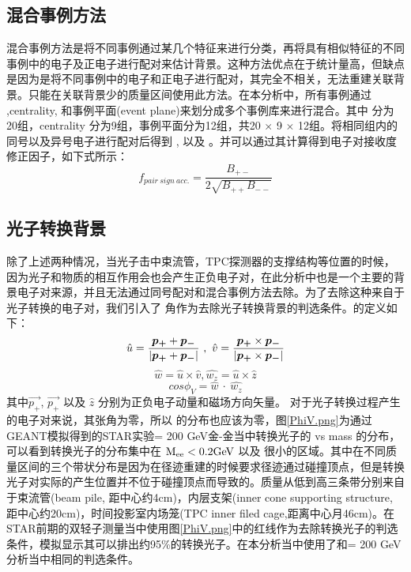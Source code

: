 \subsection{混合事例方法}
混合事例方法是将不同事例通过某几个特征来进行分类，再将具有相似特征的不同事例中的电子及正电子进行配对来估计背景。这种方法优点在于统计量高，但缺点是因为是将不同事例中的电子和正电子进行配对，其完全不相关，无法重建关联背景。只能在关联背景少的质量区间使用此方法。在本分析中，所有事例通过 \Vz ,centrality, 和事例平面(event plane)来划分成多个事例库来进行混合。其中 \Vz 分为20组，centrality 分为9组，事例平面分为12组，共20 $\times$ 9 $\times$ 12组。将相同组内的同号以及异号电子进行配对后得到 \Bpp , \Bmm 以及 \Bpm 。并可以通过其计算得到电子对接收度修正因子，如下式所示：
\begin{equation}
  f_{pair~sign~acc.} = \frac{B_{+-}}{2\sqrt{B_{++}B_{--}}}
\end{equation}


\subsection{光子转换背景}
除了上述两种情况，当光子击中束流管，TPC探测器的支撑结构等位置的时候，因为光子和物质的相互作用会也会产生正负电子对，在此分析中也是一个主要的背景电子对来源，并且无法通过同号配对和混合事例方法去除。为了去除这种来自于光子转换的电子对，我们引入了 \PhiV 角作为去除光子转换背景的判选条件。\PhiV 的定义如下：
\begin{equation}
  \hat{u} = \frac{ \vec{p_{+}} + \vec{p_{-}} }{ |\vec{p_{+}} + \vec{p_{-}}| } ~,~ \hat{v} = \frac{ \vec{p_{+}} \times \vec{p_{-}} }{ |\vec{p_{+}} \times \vec{p_{-}}| } \\
\end{equation}
\begin{equation}
  \hat{w} = \hat{u} \times \hat{v}, \hat{w_z} = \hat{u} \times \hat{z}
\end{equation}
\begin{equation}
  cos\phi_V = \hat{w}~\cdot~\hat{w_z}
\end{equation}
其中$\vec{p_{+}}$, $\vec{p_{+}}$ 以及 $\hat{z}$ 分别为正负电子动量和磁场方向矢量。
对于光子转换过程产生的电子对来说，其张角为零，所以 \PhiV 的分布也应该为零，图\ref{PhiV.png}为通过GEANT模拟得到的STAR实验\sNN = 200 GeV金-金当中转换光子的 \PhiV vs mass 的分布，可以看到转换光子的分布集中在 ${\rm M_{ee} < 0.2 GeV}$ 以及 \PhiV 很小的区域。其中在不同质量区间的三个带状分布是因为在径迹重建的时候要求径迹通过碰撞顶点，但是转换光子对实际的产生位置并不位于碰撞顶点而导致的。质量从低到高三条带分别来自于束流管(beam pile, 距中心约4cm)，内层支架(inner cone supporting structure, 距中心约20cm)，时间投影室内场笼(TPC inner filed cage,距离中心月46cm)。在STAR前期的双轻子测量当中使用图\ref{PhiV.png}中的红线作为去除转换光子的判选条件，模拟显示其可以排出约95\%的转换光子。在本分析当中使用了和\sNN = 200 GeV分析当中相同的判选条件。

